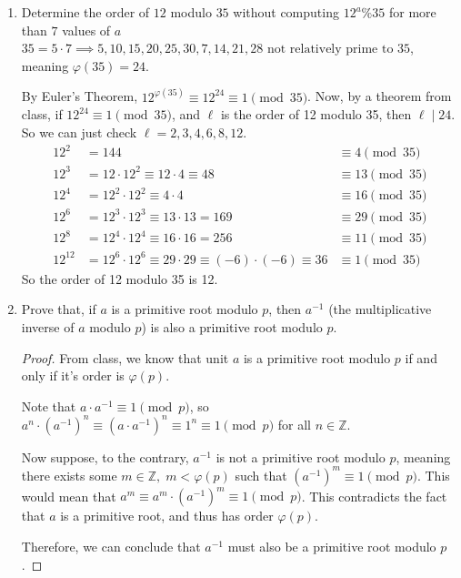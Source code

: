 \documentclass[11pt]{article}
\newcommand{\Z}{\mathbb{Z}}
\newcommand{\n}{\vspace{0.3cm}}
\begin{document}
\begin{enumerate}
\item Determine the order of $12$ modulo $35$ without computing $12^a\%35$ for more than $7$ values of $a$ \n\\
  \(35 = 5 \cdot 7 \implies 5,10,15,20,25,30,7,14,21,28 \text{ not relatively prime to } 35\), meaning \(\varphi(35) = 24\). \n

  By Euler's Theorem, \(12^{\varphi(35)} \equiv 12^{24} \equiv 1 \pmod{35}\).  Now, by a theorem from class, if \(12^{24} \equiv 1 \pmod{35}\), and \(\ell\) is the order of 12 modulo 35, then \(\ell \mid 24\). So we can just check \(\ell = 2,3,4,6,8,12\).
  \begin{align*}
    12^2 &= 144 &\equiv 4 \pmod{35} \\
    12^3 &= 12 \cdot 12^2 \equiv 12 \cdot 4 \equiv 48 &\equiv 13 \pmod{35} \\
    12^4 &= 12^2 \cdot 12^2 \equiv 4 \cdot 4 &\equiv 16 \pmod{35} \\
    12^6 &= 12^3 \cdot 12^3 \equiv 13 \cdot 13 = 169 &\equiv 29 \pmod{35} \\
    12^8 &= 12^4 \cdot 12^4 \equiv 16 \cdot 16 = 256 &\equiv 11 \pmod{35} \\
    12^{12} &= 12^6 \cdot 12^6 \equiv 29 \cdot 29 \equiv (-6) \cdot (-6) \equiv 36 &\equiv 1 \pmod{35}
  \end{align*}
  So the order of 12 modulo 35 is 12.

\item Prove that, if $a$ is a primitive root modulo $p$, then $a^{-1}$ (the multiplicative inverse of $a$ modulo $p$) is also a primitive root modulo $p$. 
  \begin{proof}
    From class, we know that unit \(a\) is a primitive root modulo \(p\) if and only if it's order is \(\varphi(p)\).

    Note that \(a \cdot a^{-1} \equiv 1 \pmod p\), so \(a^n \cdot (a^{-1})^n \equiv (a \cdot a^{-1})^n \equiv 1^n \equiv 1 \pmod p\) for all \(n \in \Z\).

    Now suppose, to the contrary, \(a^{-1}\) is not a primitive root modulo \(p\), meaning there exists some \(m \in \Z, \; m < \varphi(p)\) such that \((a^{-1})^m \equiv 1 \pmod p\).  This would mean that \(a^m \equiv a^m \cdot (a^{-1})^m \equiv 1 \pmod p\).  This contradicts the fact that \(a\) is a primitive root, and thus has order \(\varphi(p)\).

    Therefore, we can conclude that \(a^{-1}\) must also be a primitive root modulo \(p\).
  \end{proof}
  


\end{enumerate}
\end{document}
